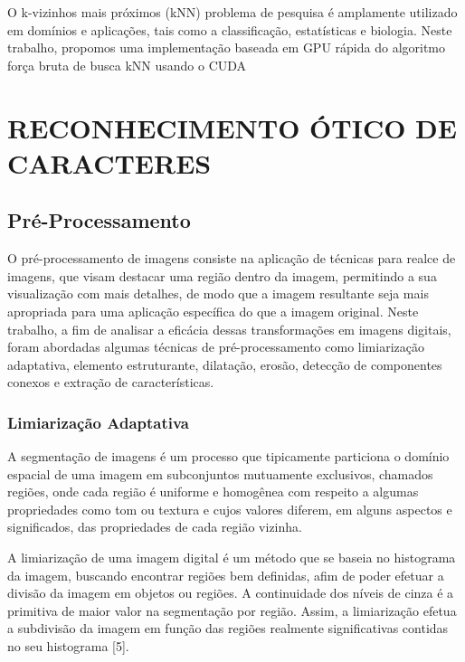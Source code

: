 \documentclass[letterpaper, 10 pt, conference]{ieeeconf}  %
\begin{document}
O k-vizinhos mais próximos (kNN) problema de pesquisa é amplamente utilizado em domínios e aplicações, tais como a classificação, estatísticas e biologia. Neste trabalho, propomos uma implementação baseada em GPU rápida do algoritmo força bruta de busca kNN usando o CUDA

\section{RECONHECIMENTO ÓTICO DE CARACTERES}

\subsection{Pré-Processamento}

O pré-processamento de imagens consiste na aplicação de técnicas para realce
de imagens, que visam destacar uma região dentro da imagem, permitindo a
sua visualização com mais detalhes, de modo que a imagem resultante seja mais
apropriada para uma aplicação específica do que a imagem original. Neste trabalho,
a fim de analisar a eficácia dessas transformações em imagens digitais,
foram abordadas algumas técnicas de pré-processamento como limiarização adaptativa, elemento estruturante, dilatação, erosão, detecção de componentes conexos e extração de características.\\

\subsubsection{Limiarização Adaptativa}

A segmentação de imagens é um processo que tipicamente particiona o domínio espacial de uma imagem em subconjuntos mutuamente exclusivos, chamados regiões, onde cada região é uniforme e homogênea com respeito a algumas propriedades como tom ou textura e cujos valores diferem, em alguns aspectos e significados, das propriedades de cada região vizinha. 

A limiarização de uma imagem digital é um método que se baseia no histograma da imagem, buscando encontrar regiões bem definidas, afim de poder efetuar a divisão da imagem em objetos ou regiões. A continuidade dos níveis de cinza é a primitiva de maior valor na segmentação por região. Assim, a limiarização efetua a subdivisão da imagem em função das regiões realmente significativas contidas no seu histograma [5]. 
\end{document}
